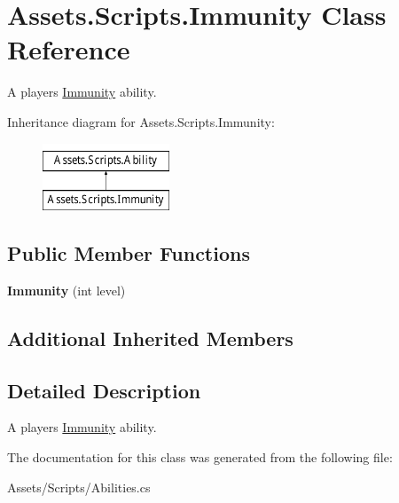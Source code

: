 \hypertarget{class_assets_1_1_scripts_1_1_immunity}{}\section{Assets.\+Scripts.\+Immunity Class Reference}
\label{class_assets_1_1_scripts_1_1_immunity}


A player\textquotesingle{}s \hyperlink{class_assets_1_1_scripts_1_1_immunity}{Immunity} ability.  


Inheritance diagram for Assets.\+Scripts.\+Immunity\+:\begin{figure}[H]
\begin{center}
\leavevmode
\includegraphics[height=2.000000cm]{class_assets_1_1_scripts_1_1_immunity}
\end{center}
\end{figure}
\subsection*{Public Member Functions}
\begin{DoxyCompactItemize}
\item 
{\bfseries Immunity} (int level)\hypertarget{class_assets_1_1_scripts_1_1_immunity_aaa115f263c40681c06885c843d36a8b2}{}\label{class_assets_1_1_scripts_1_1_immunity_aaa115f263c40681c06885c843d36a8b2}

\end{DoxyCompactItemize}
\subsection*{Additional Inherited Members}


\subsection{Detailed Description}
A player\textquotesingle{}s \hyperlink{class_assets_1_1_scripts_1_1_immunity}{Immunity} ability. 



The documentation for this class was generated from the following file\+:\begin{DoxyCompactItemize}
\item 
Assets/\+Scripts/Abilities.\+cs\end{DoxyCompactItemize}
